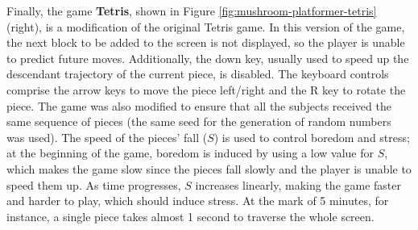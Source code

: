 Finally, the game \textbf{Tetris}, shown in Figure \ref{fig:mushroom-platformer-tetris} (right), is a modification of the original Tetris game. In this version of the game, the next block to be added to the screen is not displayed, so the player is unable to predict future moves. Additionally, the down key, usually used to speed up the descendant trajectory of the current piece, is disabled. The keyboard controls comprise the arrow keys to move the piece left/right and the R key to rotate the piece. The game was also modified to ensure that all the subjects received the same sequence of pieces (the same seed for the generation of random numbers was used). The speed of the pieces' fall ($S$) is used to control boredom and stress; at the beginning of the game, boredom is induced by using a low value for $S$, which makes the game slow since the pieces fall slowly and the player is unable to speed them up. As time progresses, $S$ increases linearly, making the game faster and harder to play, which should induce stress. At the mark of 5 minutes, for instance, a single piece takes almost 1 second to traverse the whole screen.






